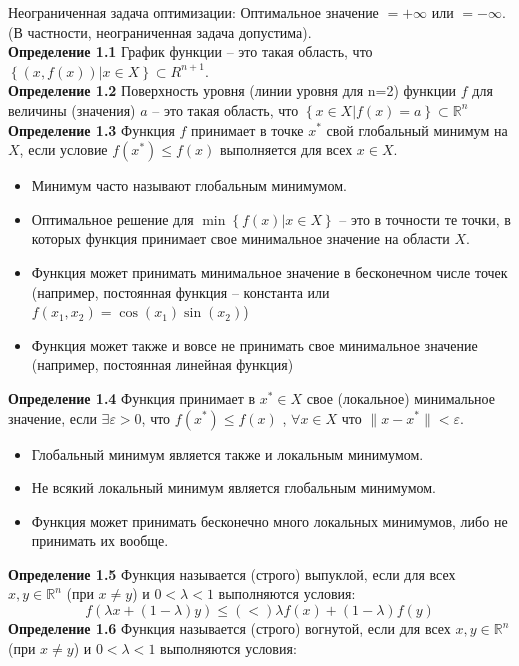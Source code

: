 Неограниченная задача оптимизации: Оптимальное значение $=+\infty$ или $=-\infty$.
\\
(В частности, неограниченная задача допустима).\\
\textbf{Определение 1.1} График функции – это такая область, что $\left\lbrace (x,f(x))|x\in X\right\rbrace \subset R^{n+1}$.\\
\textbf{Определение 1.2} Поверхность уровня (линии уровня для n=2) функции $f$ для величины (значения) $a$ – это такая область, что $\left\lbrace x\in X | f(x)=a \right\rbrace \subset \mathbb{R}^{n}$\\
\textbf{Определение 1.3} Функция $f$ принимает в точке $x^{*}$ свой глобальный минимум на $X$, если условие $f(x^{*})\leq f(x) $ выполняется для всех $ x\in X$.
\begin{itemize}
\item Минимум часто называют глобальным минимумом.
\item Оптимальное решение для $\min\left\lbrace f(x)|x\in X\right\rbrace$ – это в точности те точки, в которых функция принимает свое минимальное значение на  области $X$.
\item Функция может принимать минимальное значение в бесконечном числе точек (например, постоянная функция – константа или $f(x_1,x_2)=\cos(x_1)\sin(x_2)$)
\item Функция может также и вовсе не принимать свое минимальное значение (например, постоянная линейная функция)
\end{itemize}
\textbf{Определение 1.4} Функция принимает в $x^{*}\in X$ свое (локальное) минимальное значение, если $\exists \varepsilon >0$, что $f(x^{*})\leq f(x)$ , $\forall x\in X$ что $\| x-x^{*}\|<\varepsilon$.
\begin{itemize}
\item Глобальный минимум является также и локальным минимумом.
\item Не всякий локальный минимум является глобальным минимумом.
\item Функция может принимать бесконечно много локальных минимумов, либо не принимать их вообще.
\end{itemize}
\textbf{Определение 1.5} Функция называется (строго) выпуклой, если для всех  $x,y \in \mathbb{R}^{n}$ (при $x \neq y$) и $0<\lambda<1$  выполняются условия:
\begin{equation*}
f(\lambda x+(1-\lambda )y)\leq (<) \lambda f(x)+(1-\lambda )f(y)
\end{equation*}
\textbf{Определение 1.6} Функция называется (строго) вогнутой, если для всех  $x,y \in \mathbb{R}^{n}$ (при $x \neq y$) и $0<\lambda<1$  выполняются условия:
